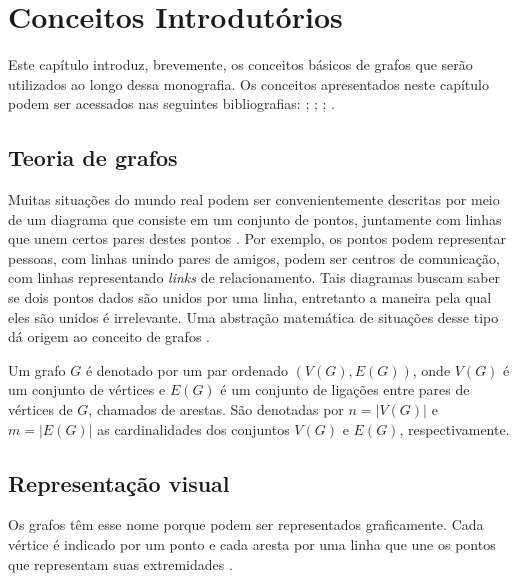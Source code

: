 \graphicspath{{\currfiledir/images/}}

\chapter{Conceitos Introdutórios}
Este capítulo introduz, brevemente, os conceitos básicos de grafos que serão utilizados ao longo dessa monografia. Os conceitos apresentados neste capítulo podem ser acessados nas seguintes bibliografias: \cite{bondymurty1976}; \cite{west2002}; \cite{bondymurty2008}; \cite{feofiloff2018}.

\section{Teoria de grafos}
Muitas situações do mundo real podem ser convenientemente descritas por meio de um diagrama que consiste em um conjunto de pontos, juntamente com linhas que unem certos pares destes pontos \cite{bondymurty1976}. Por exemplo, os pontos podem representar pessoas, com linhas unindo pares de amigos, podem ser centros de comunicação, com linhas representando \emph{links} de relacionamento. Tais diagramas buscam saber se dois pontos dados são unidos por uma linha, entretanto a maneira pela qual eles são unidos é irrelevante. Uma abstração matemática de situações desse tipo dá origem ao conceito de grafos \cite{bondymurty2008}.

\begin{definition}
    Um grafo $G$ é denotado por um par ordenado $(V(G), E(G))$, onde $V(G)$ é um conjunto de vértices e $E(G)$ é um conjunto de ligações entre pares de vértices de $G$, chamados de arestas. São denotadas por $n = |V(G)|$ e $m = |E(G)|$ as cardinalidades dos conjuntos $V(G)$ e $E(G)$, respectivamente.
\end{definition}

\section{Representação visual}
Os grafos têm esse nome porque podem ser representados graficamente. Cada vértice é indicado por um ponto e cada aresta por uma linha que une os pontos que representam suas extremidades \cite{bondymurty1976}.

